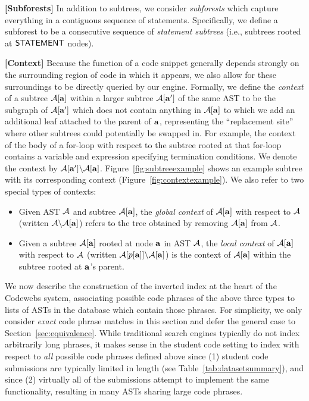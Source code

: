 {{\noindent \bf [Subforests]}} In addition to subtrees, we consider \emph{subforests} which capture everything in a contiguous sequence of statements.
Specifically, we define a subforest to be a consecutive sequence of \emph{statement subtrees} (i.e., 
subtrees rooted at ${\mathsf{STATEMENT}}$ nodes).  

{{\noindent \bf [Context]}} Because the function of a code snippet generally depends strongly on the surrounding region of code in which it appears,
we also allow for these surroundings to be directly queried by our engine. 
Formally, we define the \emph{context} of a subtree $\mathcal{A}[{\bf a}]$ within a larger subtree $\mathcal{A}[{\bf a}']$ of the same AST
to be the subgraph of $\mathcal{A}[{\bf a}']$ which does not contain anything in $\mathcal{A}[{\bf a}]$ to which we add an additional leaf attached to the parent of ${\bf a}$,
representing the ``replacement site'' where other subtrees could potentially be swapped in.
For example, the context of the body of a for-loop with respect to the subtree rooted at that for-loop contains a 
variable and expression specifying termination conditions.  We denote the context by $\mathcal{A}[{\bf a}']\backslash\mathcal{A}[{\bf a}]$.
Figure~\ref{fig:subtreeexample} shows an example subtree with its corresponding context (Figure~\ref{fig:contextexample}).
 We also refer to two special types of contexts:
\begin{itemize}
\item Given AST $\mathcal{A}$  and subtree $\mathcal{A}[{\bf a}]$, 
the \emph{global context} of $\mathcal{A}[{\bf a}]$ with respect 
to $\mathcal{A}$ (written $\mathcal{A}\backslash\mathcal{A}[{\bf a}]$) refers to the tree obtained by removing $\mathcal{A}[{\bf a}]$ from $\mathcal{A}$.
\item Given a subtree $\mathcal{A}[{\bf a}]$ rooted at node ${\bf a}$ in AST $\mathcal{A}$, the \emph{local context} of $\mathcal{A}[{\bf a}]$ with respect to $\mathcal{A}$ (written $\mathcal{A}[p[{\bf a}]]\backslash\mathcal{A}[{\bf a}]$)
is the context of $\mathcal{A}[{\bf a}]$ within the subtree rooted at ${\bf a}$'s parent.
\end{itemize}




We now describe the construction of the
inverted index at the heart of the Codewebs system, associating possible code 
phrases of the above three types to lists of ASTs in the database which contain those phrases.  For simplicity, 
we only consider \emph{exact} code phrase matches in this section and defer the general case to Section~\ref{sec:equivalence}.
While traditional search engines \cite{zobel06} typically do not index arbitrarily long phrases, it makes sense in the student code setting to index with respect to
\emph{all} possible code phrases defined above since (1) student code submissions are typically limited in length (see Table~\ref{tab:datasetsummary}), 
and since (2)  virtually all of the submissions attempt to implement the same functionality, resulting in many ASTs sharing large code phrases. 

